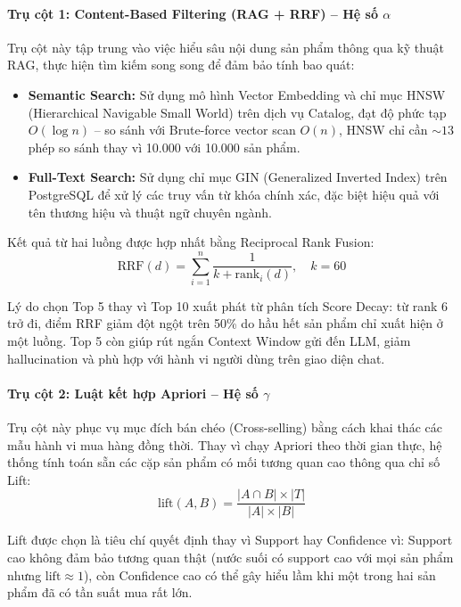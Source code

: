 \documentclass[12pt,a4paper]{report}
\begin{document}
\paragraph{Trụ cột 1: Content-Based Filtering (RAG + RRF) -- Hệ số $\alpha$}
 
Trụ cột này tập trung vào việc hiểu sâu nội dung sản phẩm thông qua kỹ thuật RAG, thực hiện tìm kiếm song song để đảm bảo tính bao quát:
 
\begin{itemize}
    \item \textbf{Semantic Search:} Sử dụng mô hình Vector Embedding và chỉ mục HNSW (Hierarchical Navigable Small World) trên dịch vụ Catalog, đạt độ phức tạp $O(\log n)$ -- so sánh với Brute-force vector scan $O(n)$, HNSW chỉ cần $\sim 13$ phép so sánh thay vì 10.000 với 10.000 sản phẩm.
    \item \textbf{Full-Text Search:} Sử dụng chỉ mục GIN (Generalized Inverted Index) trên PostgreSQL để xử lý các truy vấn từ khóa chính xác, đặc biệt hiệu quả với tên thương hiệu và thuật ngữ chuyên ngành.
\end{itemize}
 
Kết quả từ hai luồng được hợp nhất bằng Reciprocal Rank Fusion:
\[
\text{RRF}(d) = \sum_{i=1}^{n} \frac{1}{k + \text{rank}_i(d)}, \quad k = 60
\]
 
Lý do chọn Top 5 thay vì Top 10 xuất phát từ phân tích Score Decay: từ rank 6 trở đi, điểm RRF giảm đột ngột trên 50\% do hầu hết sản phẩm chỉ xuất hiện ở một luồng. Top 5 còn giúp rút ngắn Context Window gửi đến LLM, giảm hallucination và phù hợp với hành vi người dùng trên giao diện chat.
 
\paragraph{Trụ cột 2: Luật kết hợp Apriori -- Hệ số $\gamma$}
 
Trụ cột này phục vụ mục đích bán chéo (Cross-selling) bằng cách khai thác các mẫu hành vi mua hàng đồng thời. Thay vì chạy Apriori theo thời gian thực, hệ thống tính toán sẵn các cặp sản phẩm có mối tương quan cao thông qua chỉ số Lift:
\[
\text{lift}(A, B) = \frac{|A \cap B| \times |T|}{|A| \times |B|}
\]
 
Lift được chọn là tiêu chí quyết định thay vì Support hay Confidence vì: Support cao không đảm bảo tương quan thật (nước suối có support cao với mọi sản phẩm nhưng $\text{lift} \approx 1$), còn Confidence cao có thể gây hiểu lầm khi một trong hai sản phẩm đã có tần suất mua rất lớn.
 
\end{document}
